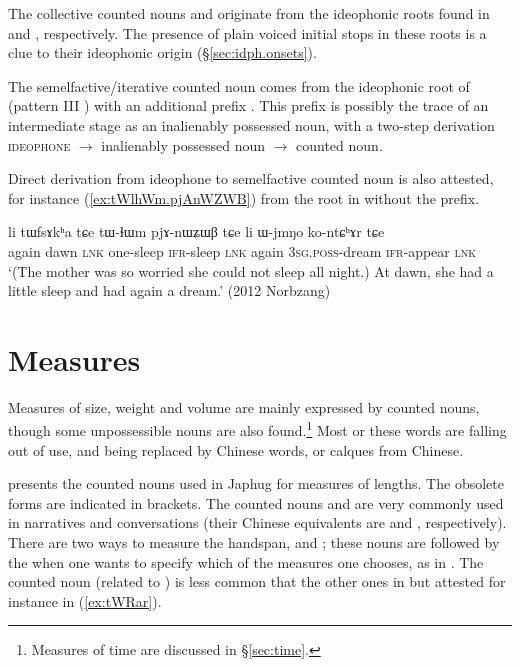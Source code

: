 The collective counted nouns  and  originate from the ideophonic roots found in  and , respectively. The presence of plain voiced initial stops in these roots is a clue to their ideophonic origin (§\ref{sec:idph.onsets}).

The semelfactive/iterative counted noun  comes from the ideophonic root of  (pattern III ) with an additional prefix . This prefix is possibly the trace of an intermediate stage as an inalienably possessed noun, with a two-step derivation \textsc{ideophone} $\rightarrow$ inalienably possessed noun $\rightarrow$ counted noun.

Direct derivation from ideophone to semelfactive counted noun is also attested, for instance  (\ref{ex:tWlhWm.pjAnWZWB}) from the root in  without the  prefix.

\begin{exe}
\ex \label{ex:tWlhWm.pjAnWZWB} 
\gll li tɯfsɤkʰa tɕe tɯ-ɬɯm pjɤ-nɯʑɯβ tɕe li ɯ-jmŋo ko-ntɕʰɤr tɕe \\
again dawn \textsc{lnk} one-sleep \textsc{ifr}-sleep \textsc{lnk} again  \textsc{3sg}.\textsc{poss}-dream \textsc{ifr}-appear \textsc{lnk} \\
\glt `(The mother was so worried she could not sleep all night.) At dawn, she had a little sleep and had again a dream.' (2012 Norbzang)
\end{exe}

\section{Measures} \label{sec:measures}
Measures of size, weight and volume are mainly expressed by counted nouns, though some unpossessible nouns are also found.\footnote{Measures of time are discussed in §\ref{sec:time}. } Most or these words are falling out of use, and being replaced by Chinese words, or calques from Chinese.

 presents the counted nouns used in Japhug for measures of lengths. The obsolete forms are indicated in brackets. The counted nouns  and  are very commonly used in narratives and conversations (their Chinese equivalents are   and   , respectively). There are two ways to measure the handspan,  and ; these nouns are followed by the  when one wants to specify which of the measures one chooses, as in . The counted noun  (related to ) is less common that the other ones in  but attested for instance in (\ref{ex:tWRar}).

